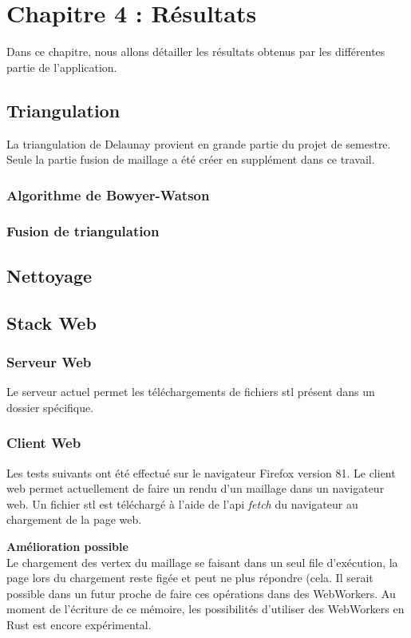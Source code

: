 
\chapter{Chapitre 4 : Résultats}
Dans ce chapitre, nous allons détailler les résultats obtenus par les
différentes partie de l'application.
\section{Triangulation}

La triangulation de Delaunay provient en grande partie du projet de semestre.
Seule la partie fusion de maillage a été créer en supplément dans ce travail.

\subsection{Algorithme de Bowyer-Watson}


\subsection{Fusion de triangulation}

\section{Nettoyage}

\section{Stack Web}
\subsection{Serveur Web}

Le serveur actuel permet les téléchargements de fichiers \gls{stl} présent dans
un dossier spécifique. 

\subsection{Client Web}
Les tests suivants ont été effectué sur le navigateur Firefox version 81.
Le client web permet actuellement de faire un rendu d'un maillage dans un
navigateur web. Un fichier \gls{stl} est téléchargé à l'aide de l'api
\textit{fetch} du navigateur au chargement de la page web.

\textbf{Amélioration possible} \\
Le chargement des vertex du maillage se faisant dans un seul file d'exécution,
la page lors du chargement reste figée et peut ne plus répondre (cela. Il serait
possible dans un futur proche de faire ces opérations dans des WebWorkers. Au
moment de l'écriture de ce mémoire, les possibilités d'utiliser des WebWorkers
en Rust est encore expérimental.
